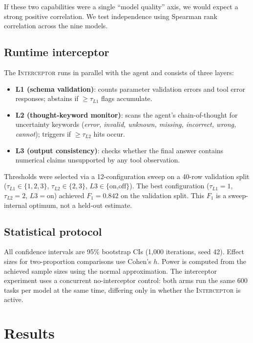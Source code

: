 \documentclass[11pt]{article}
\newcommand{\interceptor}{\textsc{Interceptor}\xspace}
\begin{document}
If these two capabilities were a single ``model quality'' axis, we would
expect a strong positive correlation.
We test independence using Spearman rank correlation across the nine
models.

\subsection{Runtime interceptor}

The \interceptor{} runs in parallel with the agent and consists of three
layers:
\begin{itemize}
  \item \textbf{L1 (schema validation)}: counts parameter validation
    errors and tool error responses; abstains if $\geq \tau_{L1}$
    flags accumulate.
  \item \textbf{L2 (thought-keyword monitor)}: scans the agent's
    chain-of-thought for uncertainty keywords (\emph{error, invalid,
    unknown, missing, incorrect, wrong, cannot}); triggers if
    $\geq \tau_{L2}$ hits occur.
  \item \textbf{L3 (output consistency)}: checks whether the final
    answer contains numerical claims unsupported by any tool
    observation.
\end{itemize}

Thresholds were selected via a 12-configuration sweep on a 40-row
validation split ($\tau_{L1}{\in}\{1,2,3\}$, $\tau_{L2}{\in}\{2,3\}$,
$L3{\in}\{\text{on,off}\}$).
The best configuration ($\tau_{L1}{=}1$, $\tau_{L2}{=}2$,
$L3{=}\text{on}$) achieved $F_1{=}0.842$ on the validation split.
This $F_1$ is a sweep-internal optimum, not a held-out estimate.

\subsection{Statistical protocol}

All confidence intervals are 95\% bootstrap CIs (1{,}000 iterations,
seed 42).
Effect sizes for two-proportion comparisons use Cohen's $h$.
Power is computed from the achieved sample sizes using the normal
approximation.
The interceptor experiment uses a concurrent no-interceptor control:
both arms run the same 600 tasks per model at the same time, differing
only in whether the \interceptor{} is active.


\section{Results}
\label{sec:results}
\end{document}
